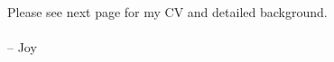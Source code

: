 \vspace{3ex}

\vspace{3ex}

Please see next page for my CV and detailed background. \\
\paragraph*{}
\begin{flushright} -- Joy\end{flushright}
